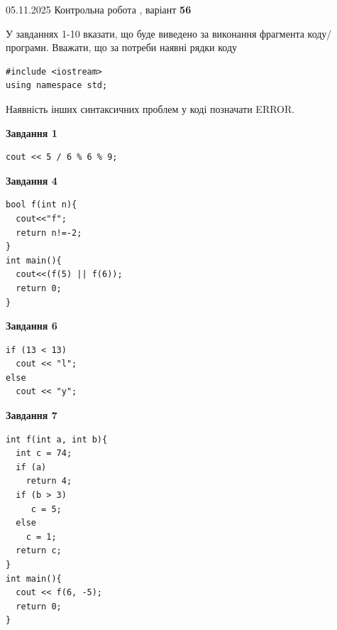 \documentclass[12pt, ukrainian]{article}
\begin{document}
\newpage

{\Large{05.11.2025 Контрольна робота , варіант  \No \textbf { 56 }\par}}
{
\begin {large}
У завданнях 1-10 вказати, що буде виведено за виконання фрагмента коду/про\-гра\-ми.
Вважати, що за потреби наявні рядки коду
\begin{verbatim}
#include <iostream>
using namespace std;
\end{verbatim}
Наявність інших синтаксичних проблем у коді позначати ERROR.

\begin{minipage}[t]{7.0cm}

\begin{center}
\textbf{Завдання 1}
\end{center}
\vspace{-8mm}

\begin{verbatim}
cout << 5 / 6 % 6 % 9;
\end{verbatim}



\begin{center}
\textbf{Завдання 4}
\end{center}
\vspace{-8mm}

\begin{verbatim}
bool f(int n){
  cout<<"f";
  return n!=-2;
}
int main(){
  cout<<(f(5) || f(6));
  return 0;
}
\end{verbatim}



\begin{center}
\textbf{Завдання 6}
\end{center}
\vspace{-8mm}

\begin{verbatim}
if (13 < 13)
  cout << "l";
else
  cout << "y";
\end{verbatim}



\begin{center}
\textbf{Завдання 7}
\end{center}
\vspace{-8mm}

\begin{verbatim}
int f(int a, int b){
  int c = 74;
  if (a)
    return 4;
  if (b > 3)
     c = 5;
  else
    c = 1;
  return c;
}
int main(){
  cout << f(6, -5);
  return 0;
}
\end{verbatim}


\end{minipage}
\end{large}}
\end{document}
